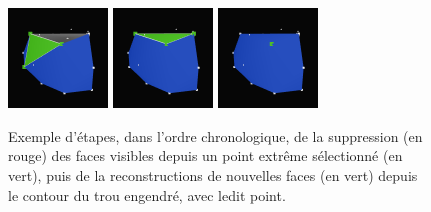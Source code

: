 \documentclass[]{article}
\begin{document}
\begin{figure}[H]
\begin{center}
		\includegraphics[width=2.65cm]{qh3d/demo3d/add_rem_3.png}
		\includegraphics[width=2.65cm]{qh3d/demo3d/add_rem_2.png}
		\includegraphics[width=2.65cm]{qh3d/demo3d/add_rem_1.png}
	\end{center}
	\caption{Exemple d'étapes, dans l'ordre chronologique, de la suppression (en rouge) des faces visibles depuis un point extrême sélectionné (en vert), puis de la reconstructions de nouvelles faces (en vert) depuis le contour du trou engendré, avec ledit point.}
\end{figure}
\end{document}

